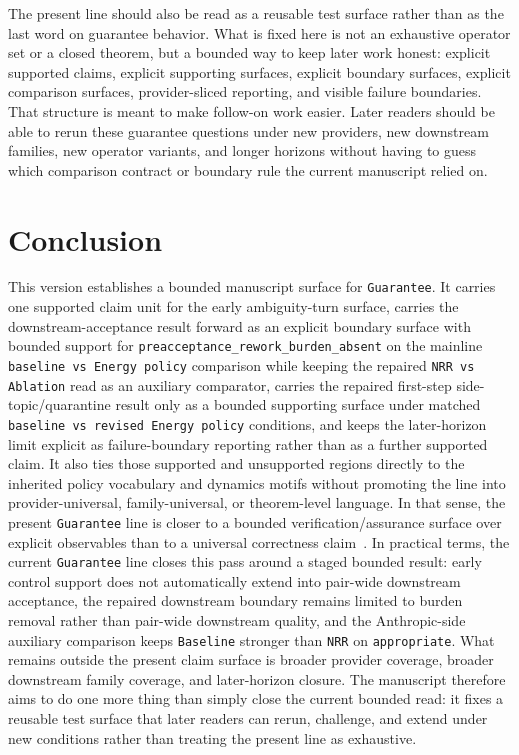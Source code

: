 \documentclass[11pt]{article}
\begin{document}
The present line should also be read as a reusable test surface rather than as
the last word on guarantee behavior. What is fixed here is not an exhaustive
operator set or a closed theorem, but a bounded way to keep later work honest:
explicit supported claims, explicit supporting surfaces, explicit boundary
surfaces, explicit comparison surfaces, provider-sliced reporting, and visible
failure boundaries. That
structure is meant to make follow-on work easier. Later readers should be able
to rerun these guarantee questions under new providers, new downstream
families, new operator variants, and longer horizons without having to guess
which comparison contract or boundary rule the current manuscript relied on.

\section{Conclusion}

This version establishes a bounded manuscript surface for \texttt{Guarantee}.
It carries one supported claim unit for the early ambiguity-turn surface,
carries the downstream-acceptance result forward as an explicit boundary
surface with bounded support for
\texttt{preacceptance\_rework\_burden\_absent} on the mainline
\texttt{baseline vs Energy policy} comparison while keeping the repaired
\texttt{NRR vs Ablation} read as an auxiliary comparator, carries the repaired
first-step side-topic/quarantine result only as a bounded supporting surface
under matched \texttt{baseline vs revised Energy policy} conditions, and keeps
the later-horizon limit explicit as failure-boundary reporting rather than as
a further supported claim. It also ties those supported and unsupported regions
directly to the inherited policy vocabulary and dynamics motifs without
promoting the line into provider-universal, family-universal, or theorem-level
language. In that sense, the present \texttt{Guarantee} line is closer to a
bounded verification/assurance surface over explicit observables than to a
universal correctness claim~\cite{seshia2022verifiedai,desai2019soter}. In
practical terms, the current \texttt{Guarantee} line closes this
pass around a staged bounded result: early control support does not
automatically extend into pair-wide downstream acceptance, the repaired
downstream boundary remains limited to burden removal rather than pair-wide
downstream quality, and the Anthropic-side auxiliary comparison keeps
\texttt{Baseline} stronger than \texttt{NRR} on \texttt{appropriate}. What
remains outside the present claim
surface is broader provider coverage, broader downstream family coverage, and
later-horizon closure. The manuscript therefore aims to do one more thing than
simply close the current bounded read: it fixes a reusable test surface that
later readers can rerun, challenge, and extend under new conditions rather
than treating the present line as exhaustive.
\end{document}
